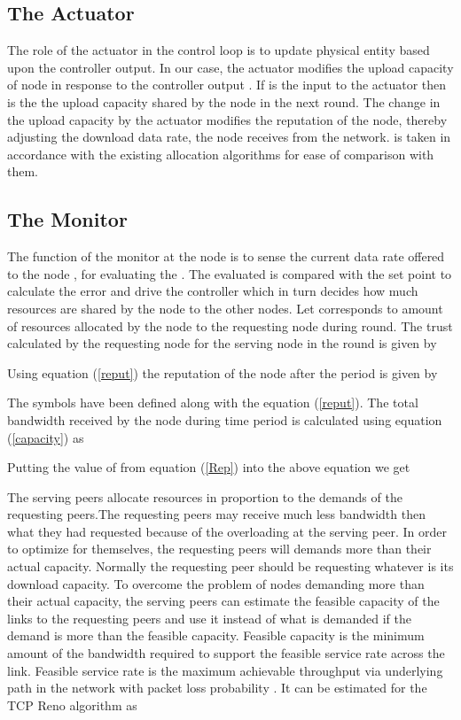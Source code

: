 \documentclass[journal]{IEEEtran}
\begin{document}
\subsection{The Actuator}
\label{act}
The role of the actuator \cite{Ogata} in the control loop is to update physical entity based upon the controller output. In our case, the actuator modifies the upload capacity of node in response to the controller output . If  is the input to the actuator then  is the the upload capacity shared by the node in the next round. The change in the upload capacity by the actuator modifies the reputation of the node, thereby adjusting the download data rate, the node receives from the network.  is taken in accordance with the existing allocation algorithms \cite{Satsiou}\cite{probabilistic_allocation} for ease of comparison with them.



\subsection{The Monitor}
The function of the monitor at the node  is to sense the current data rate  offered to the node , for evaluating the . The evaluated  is compared with the set point to calculate the error and drive the controller which in turn decides how much resources are shared by the node  to the other nodes. Let  corresponds to amount of resources allocated by the node  to the requesting node  during   round. The trust calculated by the requesting node  for the serving node  in the  round is given by

Using equation (\ref{reput}) the reputation of the node after the  period is given by 

The symbols have been defined along with the equation (\ref{reput}). The total bandwidth received by the node   during  time period  is calculated using equation (\ref{capacity}) as 

Putting the value of  from equation (\ref{Rep}) into the above equation we get

The  serving peers  allocate resources in proportion to the demands of the requesting peers.The requesting peers may receive much less bandwidth then what they had requested because of the overloading at the serving peer. In order to optimize for themselves, the requesting peers will demands more than their actual capacity. Normally the requesting peer should be requesting whatever is its download capacity. To overcome the problem of nodes demanding more than their actual capacity, the serving peers can estimate the feasible capacity of the links to the requesting peers and use it instead of what is demanded if the demand is more than the feasible capacity. Feasible capacity is the minimum amount of the bandwidth required to support the feasible service rate across the link. Feasible service rate is the maximum achievable throughput via underlying path in the network with packet loss probability
. It can be estimated for the TCP Reno algorithm \cite{feasible_rate} as
\end{document}
